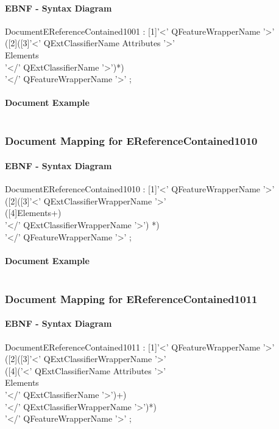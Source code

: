 \documentclass[11pt,a4paper]{article}
\begin{document}
\paragraph{EBNF - Syntax Diagram}
\begin{rail}
DocumentEReferenceContained1001 : [1]'<' QFeatureWrapperName '>' \\
([2]([3]'<' QExtClassifierName   Attributes '>' \\
Elements\\
 '</' QExtClassifierName  '>')*) \\
'</' QFeatureWrapperName '>' ;
\end{rail}
\paragraph{Document Example}
\inputminted[fontsize=\footnotesize]{xml}{examples/EReferenceContained1001.xml}

\subsubsection{Document Mapping for EReferenceContained1010}
\paragraph{EBNF - Syntax Diagram}
\begin{rail}
DocumentEReferenceContained1010 : [1]'<' QFeatureWrapperName '>' \\
([2]([3]'<' QExtClassifierWrapperName  '>' \\
([4]Elements+) \\
'</' QExtClassifierWrapperName  '>') *) \\
'</' QFeatureWrapperName '>' ;
\end{rail}
\paragraph{Document Example}
\inputminted[fontsize=\footnotesize]{xml}{examples/EReferenceContained1010.xml}

\subsubsection{Document Mapping for EReferenceContained1011}
\paragraph{EBNF - Syntax Diagram}
\begin{rail}
DocumentEReferenceContained1011 : [1]'<' QFeatureWrapperName '>' \\
([2]([3]'<' QExtClassifierWrapperName  '>' \\
([4]('<' QExtClassifierName  Attributes '>' \\
Elements \\
'</' QExtClassifierName  '>')+) \\
'</' QExtClassifierWrapperName  '>')*)\\
'</' QFeatureWrapperName '>' ;
\end{rail}
\end{document}
